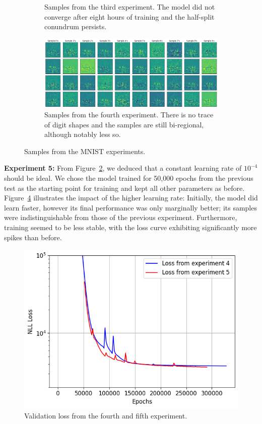 \begin{figure}
\begin{subfigure}[t]{0.45\textwidth}
    \caption{\footnotesize Samples from the third experiment. The model did not converge after eight hours of training and the half-split conundrum persists.}
    \label{fig:mnist_run_3_samples}
\end{subfigure}
\hfill
\begin{subfigure}[t]{0.45\textwidth}
    \includegraphics[width=\textwidth]{images/mnist_maxpooling/run_4_samples.png}
    \caption{\footnotesize Samples from the fourth experiment. There is no trace of digit shapes and the samples are still bi-regional, although notably less so.}
    \label{fig:mnist_run_4_samples}
\end{subfigure}
\caption{Samples from the MNIST experiments.}
\label{fig:mnist-all-samples}
\end{figure}

\textbf{Experiment 5:} From Figure~\ref{fig:mnist_run_4_samples}, we deduced that a constant learning rate of $10^{-4}$ should be ideal. We chose the model trained for 50,000 epochs from the previous test as the starting point for training and kept all other parameters as before. Figure~\ref{fig:mnist_4_vs_5} illustrates the impact of the higher learning rate: Initially, the model did learn faster, however its final performance was only marginally better; its samples were indistinguishable from those of the previous experiment. Furthermore, training seemed to be less stable, with the loss curve exhibiting significantly more spikes than before.

\begin{figure}
\centering
\includegraphics[width=.7\textwidth]{images/mnist_maxpooling/run_4_vs_5.png}
\caption{Validation loss from the fourth and fifth experiment.}
\label{fig:mnist_4_vs_5}
\end{figure}


